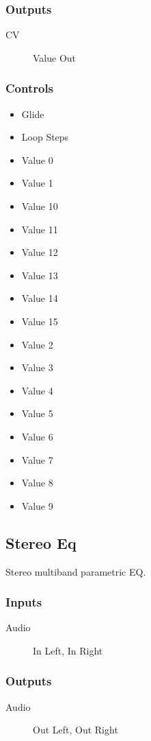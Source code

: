 \subsubsection{Outputs}
\begin{description}
\item [CV] Value Out
\end{description}

\subsubsection{Controls}
\begin{itemize}
\item Glide
\item Loop Steps
\item Value 0
\item Value 1
\item Value 10
\item Value 11
\item Value 12
\item Value 13
\item Value 14
\item Value 15
\item Value 2
\item Value 3
\item Value 4
\item Value 5
\item Value 6
\item Value 7
\item Value 8
\item Value 9
\end{itemize}

\subsection{Stereo Eq}

Stereo multiband parametric EQ.



\subsubsection{Inputs}
\begin{description}
\item [Audio] In Left, In Right
\end{description}

\subsubsection{Outputs}
\begin{description}
\item [Audio] Out Left, Out Right
\end{description}

